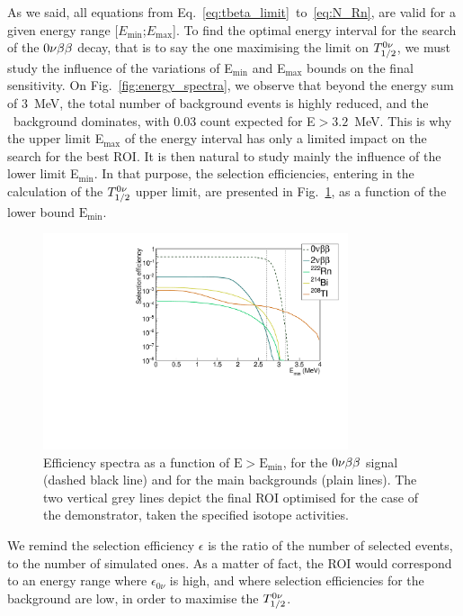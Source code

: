 As we said, all equations from Eq.~\eqref{eq:tbeta_limit}~to~\eqref{eq:N_Rn}, are valid for a given energy range [$E_{\text{min}}$;$E_{\text{max}}$].
To find the optimal energy interval for the search of the $0\nu\beta\beta$ decay, that is to say the one maximising the limit on $T_{1/2}^{0\nu}$, we must study the influence of the variations of E$_{\text{min}}$ and E$_{\text{max}}$ bounds on the final sensitivity.
On Fig.~\ref{fig:energy_spectra}, we observe that beyond the energy sum of $3$~MeV, the total number of background events is highly reduced, and the \Tl\ background dominates, with $0.03$ count expected for E$>3.2$~MeV.
This is why the upper limit E$_{\text{max}}$ of the energy interval has only a limited impact on the search for the best ROI.
It is then natural to study mainly the influence of the lower limit E$_{\text{min}}$.
In that purpose, the selection efficiencies, entering in the calculation of the $T_{1/2}^{0\nu}$ upper limit, are presented in Fig.~\ref{fig:efficiency_spectra}, as a function of the lower bound $\text{E}_{\text{min}}$.
\begin{figure}[h!]
  \centering
  \includegraphics[width=0.8\textwidth]{Sensitivity/fig_sensitivity/efficiency_spectrum_with_B_82Se.pdf}
  \caption{Efficiency spectra as a function of $\text{E}>\text{E}_{\text{min}}$, for the $0\nu\beta\beta$ signal (dashed black line) and for the main backgrounds (plain lines).
    The two vertical grey lines depict the final ROI optimised for the case of the demonstrator, taken the specified isotope activities.
    \label{fig:efficiency_spectra}}
\end{figure}
We remind the selection efficiency $\epsilon$ is the ratio of the number of selected events, to the number of simulated ones.
As a matter of fact, the ROI would correspond to an energy range where $\epsilon_{0\nu}$ is high, and where selection efficiencies for the background are low, in order to maximise the $T_{1/2}^{0\nu}$.

